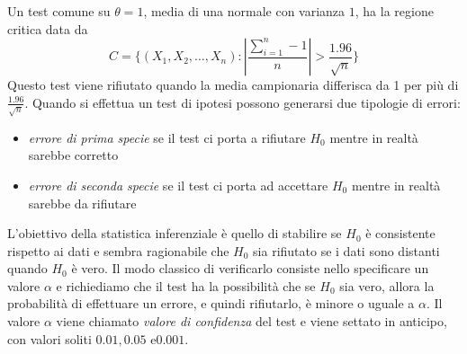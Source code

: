 Un test comune su $\theta = 1$, media di una normale con varianza $1$, ha la regione critica data da
\[ C = \{(X_1, X_2, \dots, X_n) : |\frac{\sum _{i = 1} ^ n - 1}{n}| > \frac{1.96}{\sqrt{n}}\} \]
Questo test viene rifiutato quando la media campionaria differisca da 1 per più di $\frac{1.96}{\sqrt{n}}$.\newline
Quando si effettua un test di ipotesi possono generarsi due tipologie di errori:
\begin{itemize}
    \item \emph{errore di prima specie} se il test ci porta a rifiutare $H_0$ mentre in realtà sarebbe corretto
    \item \emph{errore di seconda specie} se il test ci porta ad accettare $H_0$ mentre in realtà sarebbe da rifiutare
\end{itemize}
L'obiettivo della statistica inferenziale è quello di stabilire se $H_0$ è consistente rispetto ai dati e sembra
ragionabile che $H_0$ sia rifiutato se i dati sono distanti quando $H_0$ è vero.\newline
Il modo classico di verificarlo consiste nello specificare un valore $\alpha$ e richiediamo che il test ha la
possibilità che se $H_0$ sia vero, allora la probabilità di effettuare un errore, e quindi rifiutarlo, è minore o uguale
a $\alpha$.\newline
Il valore $\alpha$ viene chiamato \emph{valore di confidenza} del test e viene settato in anticipo, con valori soliti
$0.01, 0.05 \text{ e} 0.001$.


